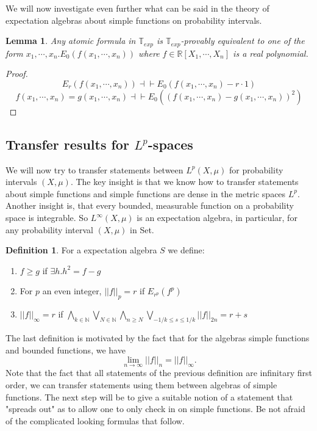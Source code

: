 \documentclass[a4paper]{amsproc}
\theoremstyle{plain}
\newtheorem{lemma}[theorem]{Lemma}
\theoremstyle{definition}
\newtheorem{definition}[theorem]{Definition}
\theoremstyle{remark}
\numberwithin{equation}{section}
\begin{document}
We will now investigate even further what can be said in the theory of expectation algebras about simple functions on probability intervals.
\begin{lemma} Any atomic formula in $\mathbb{T}_{exp}$ is $\mathbb{T}_{exp}$-provably equivalent to one of the form $x_1,\cdots, x_n. E_0(f(x_1,\cdots,x_n))$ where $f\in \mathbb{R}[X_1,\cdots, X_n]$ is a real polynomial. 
\end{lemma}
\begin{proof}
\[ E_r(f(x_1,\cdots, x_n))\dashv \vdash E_0(f(x_1,\cdots, x_n)-r\cdot 1)    \]
\[ f(x_1,\cdots, x_n)=g(x_1,\cdots ,x_n)\dashv\vdash E_0((f(x_1,\cdots, x_n)-g(x_1,\cdots ,x_n))^2)  \]
\end{proof}
\subsection{Transfer results for $L^p$-spaces}
We will now try to transfer statements between $L^p(X,\mu)$ for probability intervals $(X,\mu)$. The key insight is that we know how to transfer statements about simple functions and simple functions are dense in the metric spaces $L^p$. Another insight is, that every bounded, measurable function on a probability space is integrable. So $L^\infty(X,\mu)$ is an expectation algebra, in particular, for any probability interval $(X,\mu)$ in Set.
\begin{definition} For a expectation algebra $S$ we define:
\begin{enumerate}
\item $f\geq g$ if $\exists h. h^2=f-g$
\item For $p$ an even integer, $||f||_p=r$ if $E_{r^p}(f^p)$
\item $||f||_\infty=r$ if $\bigwedge_{k\in\mathbb{N}}\bigvee_{N\in\mathbb{N}}\bigwedge_{n\geq N}\bigvee_{-1/k\leq s\leq 1/k}||f||_{2n}=r+s$
\end{enumerate}
\end{definition}
The last definition is motivated by the fact that for the algebras simple functions and bounded functions, we have
\[  \lim_{n\rightarrow \infty} ||f||_n=||f||_\infty. \]
Note that the fact that all statements of the previous definition are infinitary first order, we can transfer statements using them between algebras of simple functions. The next step will be to give a suitable notion of a statement that "spreads out" as to allow one to only check in on simple functions. Be not afraid of the complicated looking formulas that follow.
\end{document}
